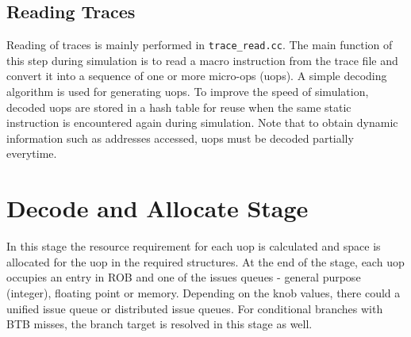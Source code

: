


\subsection{Reading Traces} 

Reading of traces is mainly performed in \Verb+trace_read.cc+. The
main function of this step during simulation is to read a macro
instruction from the trace file and convert it into a sequence of one
or more micro-ops (uops). A simple decoding algorithm is used for
generating uops. To improve the speed of simulation, decoded uops are
stored in a hash table for reuse when the same static instruction is
encountered again during simulation. Note that to obtain dynamic
information such as addresses accessed, uops must be decoded partially
everytime.



\section{Decode and  Allocate Stage}

\ignore
{

}

In this stage the resource requirement for each uop is calculated and space is
allocated for the uop in the required structures. At the end of the stage, each
uop occupies an entry in ROB and one of the issues queues - general purpose
(integer), floating point or memory. Depending on the knob values, there could
a unified issue queue or distributed issue queues. For conditional branches
with BTB misses, the branch target is resolved in this stage as well.


